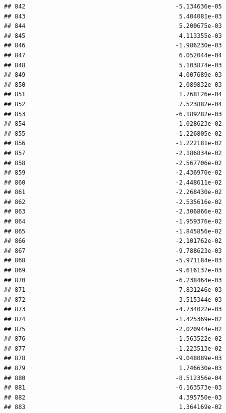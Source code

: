 \documentclass[
]{article}
\begin{document}
\begin{verbatim}
## 842                                          -5.134636e-05
## 843                                           5.404081e-03
## 844                                           5.200675e-03
## 845                                           4.113355e-03
## 846                                          -1.986230e-03
## 847                                           6.052044e-04
## 848                                           5.103874e-03
## 849                                           4.007689e-03
## 850                                           2.089832e-03
## 851                                           1.768126e-04
## 852                                           7.523882e-04
## 853                                          -6.189282e-03
## 854                                          -1.028623e-02
## 855                                          -1.226805e-02
## 856                                          -1.222181e-02
## 857                                          -2.186834e-02
## 858                                          -2.567706e-02
## 859                                          -2.436970e-02
## 860                                          -2.448611e-02
## 861                                          -2.268430e-02
## 862                                          -2.535616e-02
## 863                                          -2.306866e-02
## 864                                          -1.959376e-02
## 865                                          -1.845856e-02
## 866                                          -2.101762e-02
## 867                                          -9.788623e-03
## 868                                          -5.971184e-03
## 869                                          -9.616137e-03
## 870                                          -6.238464e-03
## 871                                          -7.831246e-03
## 872                                          -3.515344e-03
## 873                                          -4.734022e-03
## 874                                          -1.425369e-02
## 875                                          -2.020944e-02
## 876                                          -1.563522e-02
## 877                                          -1.223513e-02
## 878                                          -9.048089e-03
## 879                                           1.746630e-03
## 880                                          -8.512356e-04
## 881                                          -6.163573e-03
## 882                                           4.395750e-03
## 883                                           1.364169e-02

\end{verbatim}
\end{document}
